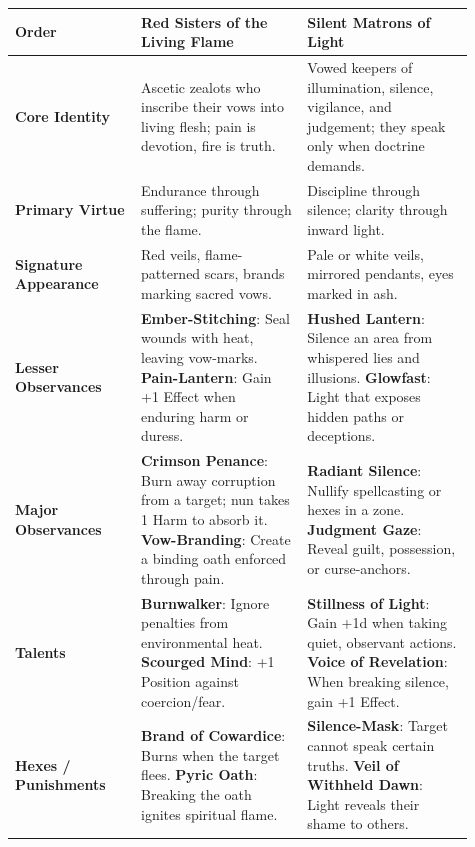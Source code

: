 \documentclass[11pt]{book}
\begin{document}
    \centering
    \renewcommand{\arraystretch}{1.35}
    \begin{longtable}{p{0.25\linewidth} p{0.33\linewidth} p{0.33\linewidth}}
    \toprule
    \textbf{Order} &
    \textbf{Red Sisters of the Living Flame} &
    \textbf{Silent Matrons of Light} \\
    \midrule
    
    \textbf{Core Identity} &
    Ascetic zealots who inscribe their vows into living flesh;  
    pain is devotion, fire is truth. &
    Vowed keepers of illumination, silence, vigilance, and judgement;  
    they speak only when doctrine demands. \\
    
    \textbf{Primary Virtue} &
    Endurance through suffering; purity through the flame. &
    Discipline through silence; clarity through inward light. \\
    
    \textbf{Signature Appearance} &
    Red veils, flame-patterned scars, brands marking sacred vows. &
    Pale or white veils, mirrored pendants, eyes marked in ash. \\
    
    \textbf{Lesser Observances} &
    \textbf{Ember-Stitching}: Seal wounds with heat, leaving vow-marks.  
    \textbf{Pain-Lantern}: Gain +1 Effect when enduring harm or duress. &
    \textbf{Hushed Lantern}: Silence an area from whispered lies and illusions.  
    \textbf{Glowfast}: Light that exposes hidden paths or deceptions. \\
    
    \textbf{Major Observances} &
    \textbf{Crimson Penance}: Burn away corruption from a target;  
    nun takes 1 Harm to absorb it.  
    \textbf{Vow-Branding}: Create a binding oath enforced through pain. &
    \textbf{Radiant Silence}: Nullify spellcasting or hexes in a zone.  
    \textbf{Judgment Gaze}: Reveal guilt, possession, or curse-anchors. \\
    
    \textbf{Talents} &
    \textbf{Burnwalker}: Ignore penalties from environmental heat.  
    \textbf{Scourged Mind}: +1 Position against coercion/fear. &
    \textbf{Stillness of Light}: Gain +1d when taking quiet, observant actions.  
    \textbf{Voice of Revelation}: When breaking silence, gain +1 Effect. \\
    
    \textbf{Hexes / Punishments} &
    \textbf{Brand of Cowardice}: Burns when the target flees.  
    \textbf{Pyric Oath}: Breaking the oath ignites spiritual flame. &
    \textbf{Silence-Mask}: Target cannot speak certain truths.  
    \textbf{Veil of Withheld Dawn}: Light reveals their shame to others. \\
    

\end{longtable}
\end{document}
